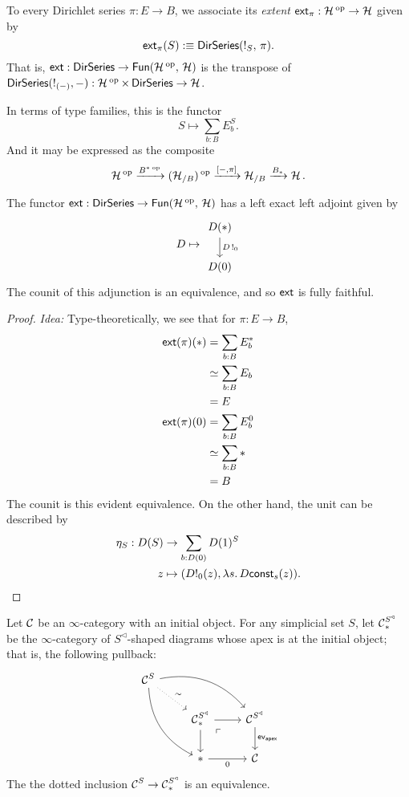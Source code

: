 \begin{defn}
To every Dirichlet series $\pi : E \to B$, we associate its \emph{extent}
$\mathsf{{ext}}_{\pi} : \operatorname{\mathcal{H}}\operatorname{^\text{op}} \to \operatorname{\mathcal{H}}$ given by
$$\mathsf{{ext}}_{\pi}(S) :\equiv \operatorname{\mathsf{{DirSeries}}}(\operatorname{!}_S,\, \pi).$$
That is, $\mathsf{{ext}} : \operatorname{\mathsf{{DirSeries}}} \to \operatorname{\mathsf{{Fun}}}(\operatorname{\mathcal{H}}\operatorname{^\text{op}},\, \operatorname{\mathcal{H}})$ is the transpose of
$\operatorname{\mathsf{{DirSeries}}}(\operatorname{!}_{(-)}, -) : \operatorname{\mathcal{H}}\operatorname{^\text{op}} \times \operatorname{\mathsf{{DirSeries}}} \to \operatorname{\mathcal{H}}$.

In terms of type families, this is the functor
$$S \mapsto \sum_{b : B} E_b^S.$$
And it may be expressed as the composite
$$\operatorname{\mathcal{H}}\operatorname{^\text{op}} \xrightarrow{B^{\ast}\operatorname{^\text{op}}} (\operatorname{\mathcal{H}}_{/B})\operatorname{^\text{op}} \xrightarrow{[-,\pi]} \operatorname{\mathcal{H}}_{/B} \xrightarrow{B_{\ast}}
\operatorname{\mathcal{H}}.$$
\end{defn}




\begin{prop}
The functor $\mathsf{{ext}} : \operatorname{\mathsf{{DirSeries}}} \to \operatorname{\mathsf{{Fun}}}(\operatorname{\mathcal{H}}\operatorname{^\text{op}},\, \operatorname{\mathcal{H}})$ has a left exact
left adjoint given by
$$D \mapsto \begin{tikzcd} D(\ast) \arrow[d, "D\bang_0"] \\ D(0) \end{tikzcd}$$
The counit of this adjunction is an equivalence, and so $\mathsf{{ext}}$ is fully faithful.
\end{prop}
\begin{proof}
\emph{Idea:} Type-theoretically, we see that for $\pi : E \to B$,
\begin{align*}
  \mathsf{{ext}}(\pi)(\ast) &= \sum_{b : B}E_b^\ast\\
  &\simeq \sum_{b : B} E_b\\
  &= E\\
  \mathsf{{ext}}(\pi)(0) &= \sum_{b : B}E_b^0\\
  &\simeq \sum_{b : B} \ast\\
    &= B
\end{align*}
The counit is this evident equivalence. On the other hand, the unit can be
described by
\begin{align*}
  \eta_S : D(S) &\to \sum_{b : D(0)} D(1)^S\\
  z &\mapsto (D!_0(z), \lambda {s}.\, D\mathsf{{const}}_s(z)).
\end{align*}
\end{proof}

\begin{lem}\label{lem:cone.initial.equivalence}
Let $\operatorname{\mathcal{C}}$ be an $\infty$-category with an initial object. For any simplicial set
$S$, let $\operatorname{\mathcal{C}}^{S^{\triangleleft}}_{\ast}$ be the $\infty$-category of
  $S^{\triangleleft}$-shaped diagrams whose apex is at the initial object; that
  is, the following pullback:
  \[
    \begin{tikzcd}
      \Ca^{S} \arrow[drr, bend left] \arrow[ddr, bend right] \arrow[dr,
      dotted, "\sim"] & & \\
      & \Ca^{S^{\triangleleft}}_{\ast} \arrow[d] \arrow[r] \arrow[dr, phantom,
      "\ulcorner" very near start] & \Ca^{S^{\triangleleft}} \arrow[d,
      "\term{ev}_{\term{apex}}"] \\
      & \ast \arrow[r, "0"'] & \Ca
    \end{tikzcd}
  \]
The the dotted inclusion $\operatorname{\mathcal{C}}^{S} \to \operatorname{\mathcal{C}}^{S^{\triangleleft}}_{\ast}$ is an equivalence.
\end{lem}

